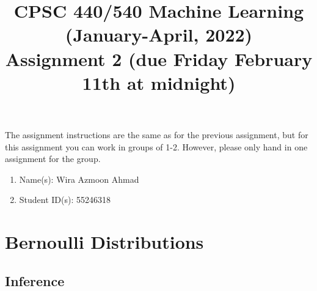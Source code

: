 \documentclass{article}
\def\blu#1{{\color{blu}#1}}
\def\enum#1{\begin{enumerate}#1\end{enumerate}}
\begin{document}
\title{CPSC 440/540 Machine Learning (January-April, 2022)\\Assignment 2 (due Friday February 11th at midnight)}
\author{}
\date{}
\maketitle
\vspace{-4em}

The assignment instructions are the same as for the previous assignment, but for this assignment you can work in groups of 1-2. However, please only hand in one assignment for the group.


\blu{\enum{
\item Name(s): Wira Azmoon Ahmad
\item Student ID(s): 55246318
}}

\section{Bernoulli Distributions}

\subsection{Inference}
\end{document}
